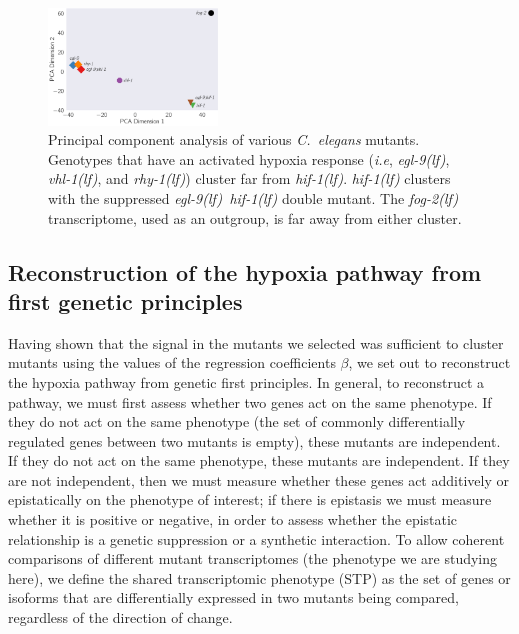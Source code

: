\documentclass[9pt,twocolumn,twoside,lineno]{pnas-new}
\newcommand{\cel}{\emph{C.~elegans}}
\newcommand{\fog}{\emph{\mbox{fog-2(lf)}}}
\newcommand{\egl}{\emph{\mbox{egl-9}(lf)}}
\newcommand{\rhy}{\emph{\mbox{rhy-1}(lf)}}
\newcommand{\vhl}{\emph{\mbox{vhl-1}(lf)}}
\newcommand{\eglhif}{\emph{\mbox{egl-9(lf)}~\mbox{hif-1(lf)}}}
\newcommand{\hif}{\emph{\mbox{hif-1(lf)}}}
\begin{document}
\begin{figure}[tbhp]
\centering
\includegraphics[width=0.4\textwidth]{../figs/pca.pdf}
\caption{
Principal component analysis of various \cel{} mutants. Genotypes that have an
activated hypoxia response (\emph{i.e}, \egl{}, \vhl{}, and \rhy{}) cluster far
from \hif{}. \hif{} clusters with the suppressed \eglhif{} double mutant.
The \fog{} transcriptome, used as an outgroup, is far away from either cluster.
}
\label{fig:pca}
\end{figure}

\subsection*{Reconstruction of the hypoxia pathway from first genetic principles}
\label{sec:reconstruct}
Having shown that the signal in the mutants we selected was sufficient to
cluster mutants using the values of the regression coefficients $\beta$, we set
out to reconstruct the hypoxia pathway from genetic first principles. In general,
to reconstruct a pathway, we must first assess whether two genes act on the same
phenotype. If they do not act on the same phenotype (the set of commonly
differentially regulated genes between two mutants is empty), these mutants are
independent. If they do not act on the same phenotype, these mutants are
independent. If they are not independent, then we must measure whether these
genes act additively or epistatically on the phenotype of interest; if there is
epistasis we must measure whether it is positive or negative, in order to assess
whether the epistatic relationship is a genetic suppression or a synthetic
interaction. To allow coherent comparisons of different mutant transcriptomes
(the phenotype we are studying here), we define the shared transcriptomic
phenotype (STP) as the set of genes or isoforms that are differentially
expressed in two mutants being compared, regardless of the direction of change.
\end{document}
